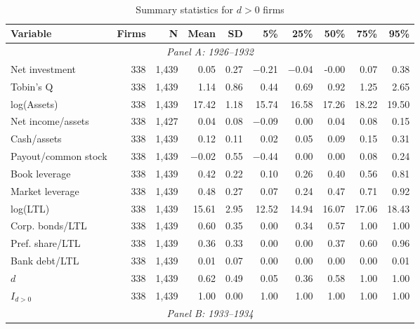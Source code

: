 \begin{table}[p]\centering
    \caption{\\ Summary statistics for $d > 0$ firms}\scriptsize
    \label{tabapp:summary_d_1}
    \begin{threeparttable}
        \begin{tabular}{lrrrrrrrrr}
            \toprule
            Variable & Firms & N & Mean & SD & 5\% & 25\% & 50\% & 75\% & 95\% \\
            \midrule
            \multicolumn{10}{c}{\textit{Panel A: 1926--1932}} \\
            \midrule
            Net investment & 338 & 1,439 & 0.05 & 0.27 & $-$0.21 & $-$0.04 & -0.00 & 0.07 & 0.38 \\
            Tobin's Q & 338 & 1,439 & 1.14 & 0.86 & 0.44 & 0.69 & 0.92 & 1.25 & 2.65 \\
            log(Assets) & 338 & 1,439 & 17.42 & 1.18 & 15.74 & 16.58 & 17.26 & 18.22 & 19.50 \\
            Net income/assets & 338 & 1,427 & 0.04 & 0.08 & $-$0.09 & 0.00 & 0.04 & 0.08 & 0.15 \\
            Cash/assets & 338 & 1,439 & 0.12 & 0.11 & 0.02 & 0.05 & 0.09 & 0.15 & 0.31 \\
            Payout/common stock & 338 & 1,439 & $-$0.02 & 0.55 & $-$0.44 & 0.00 & 0.00 & 0.08 & 0.24 \\
            Book leverage & 338 & 1,439 & 0.42 & 0.22 & 0.10 & 0.26 & 0.40 & 0.56 & 0.81 \\
            Market leverage & 338 & 1,439 & 0.48 & 0.27 & 0.07 & 0.24 & 0.47 & 0.71 & 0.92 \\
            log(LTL) & 338 & 1,439 & 15.61 & 2.95 & 12.52 & 14.94 & 16.07 & 17.06 & 18.43 \\
            Corp. bonds/LTL & 338 & 1,439 & 0.60 & 0.35 & 0.00 & 0.34 & 0.57 & 1.00 & 1.00 \\
            Pref. share/LTL & 338 & 1,439 & 0.36 & 0.33 & 0.00 & 0.00 & 0.37 & 0.60 & 0.96 \\
            Bank debt/LTL & 338 & 1,439 & 0.01 & 0.07 & 0.00 & 0.00 & 0.00 & 0.00 & 0.01 \\
            \ensuremath{d} & 338 & 1,439 & 0.62 & 0.49 & 0.05 & 0.36 & 0.58 & 1.00 & 1.00 \\
            \ensuremath{I_{d>0}} & 338 & 1,439 & 1.00 & 0.00 & 1.00 & 1.00 & 1.00 & 1.00 & 1.00 \\
            \midrule
            \multicolumn{10}{c}{\textit{Panel B: 1933--1934}} \\

\end{tabular}
\end{threeparttable}
\end{table}
